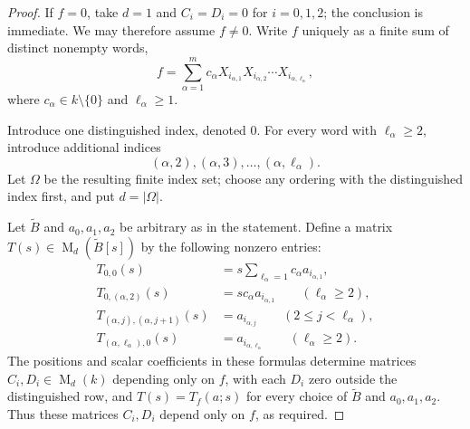 \documentclass[11pt]{article}
\newcommand{\Mat}{\operatorname{M}}
\begin{document}
\begin{proof}
If $f=0$, take $d=1$ and $C_i=D_i=0$ for $i=0,1,2$; the conclusion is immediate.  We may therefore assume $f\ne0$.  Write $f$ uniquely as a finite sum of distinct nonempty words,
\begin{equation}\label{eq:fwords}
f=\sum_{\alpha=1}^m c_\alpha
X_{i_{\alpha,1}}X_{i_{\alpha,2}}\cdots X_{i_{\alpha,\ell_\alpha}},
\end{equation}
where $c_\alpha\in k\setminus\{0\}$ and $\ell_\alpha\ge1$.

Introduce one distinguished index, denoted $0$.  For every word with $\ell_\alpha\ge2$, introduce additional indices
\[
(\alpha,2),(\alpha,3),\ldots,(\alpha,\ell_\alpha).
\]
Let $\Omega$ be the resulting finite index set; choose any ordering with the distinguished index first, and put $d=|\Omega|$.

Let $\widetilde B$ and $a_0,a_1,a_2$ be arbitrary as in the statement.  Define a matrix $T(s)\in\Mat_d(\widetilde B[s])$ by the following nonzero entries:
\begin{align}
T_{0,0}(s)
&=s\sum_{\ell_\alpha=1}c_\alpha a_{i_{\alpha,1}},\label{eq:T00}\\
T_{0,(\alpha,2)}(s)
&=s c_\alpha a_{i_{\alpha,1}}
\qquad(\ell_\alpha\ge2),\label{eq:Troot}\\
T_{(\alpha,j),(\alpha,j+1)}(s)
&=a_{i_{\alpha,j}}
\qquad(2\le j<\ell_\alpha),\label{eq:Tchain}\\
T_{(\alpha,\ell_\alpha),0}(s)
&=a_{i_{\alpha,\ell_\alpha}}
\qquad(\ell_\alpha\ge2).\label{eq:Tlast}
\end{align}
The positions and scalar coefficients in these formulas determine matrices $C_i,D_i\in\Mat_d(k)$ depending only on $f$, with each $D_i$ zero outside the distinguished row, and $T(s)=T_f(a;s)$ for every choice of $\widetilde B$ and $a_0,a_1,a_2$.  Thus these matrices $C_i,D_i$ depend only on $f$, as required.


\end{proof}
\end{document}
